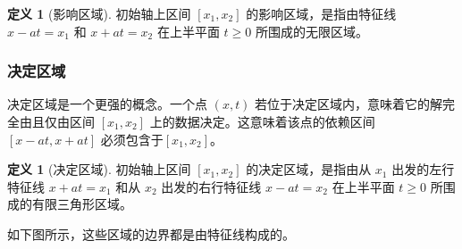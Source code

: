 \documentclass[12pt,a4paper]{article}
\numberwithin{subsection}{section}
\numberwithin{subsubsection}{subsection}
\theoremstyle{plain}
\theoremstyle{definition}
\newtheorem{definition}[theorem]{定义}
\theoremstyle{remark}
\begin{document}
\begin{definition}[影响区域]
	初始轴上区间 \([x_1, x_2]\) 的影响区域，是指由特征线 \(x-at=x_1\) 和 \(x+at=x_2\) 在上半平面 \(t \ge 0\) 所围成的无限区域。
\end{definition}

\subsubsection{决定区域 }
决定区域是一个更强的概念。一个点 \((x,t)\) 若位于决定区域内，意味着它的解完全由且仅由区间 \([x_1, x_2]\) 上的数据决定。这意味着该点的依赖区间 \([x-at, x+at]\) 必须包含于\([x_1, x_2]\)。

\begin{definition}[决定区域]
	初始轴上区间 \([x_1, x_2]\) 的决定区域，是指由从 \(x_1\) 出发的左行特征线 \(x+at=x_1\) 和从 \(x_2\) 出发的右行特征线 \(x-at=x_2\) 在上半平面 \(t \ge 0\) 所围成的有限三角形区域。
\end{definition}

如下图所示，这些区域的边界都是由特征线构成的。
\end{document}
